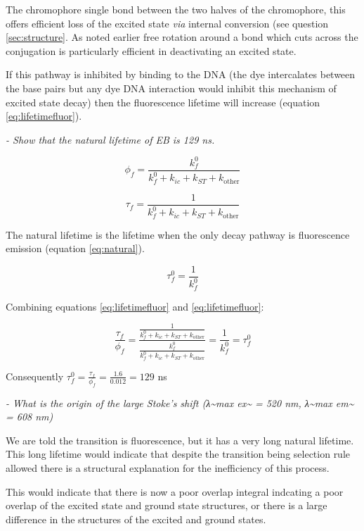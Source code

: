 \documentclass[
]{book}
\begin{document}
The chromophore single bond between the two halves of the chromophore, this offers efficient loss of the excited state \emph{via} internal conversion (see question \ref{sec:structure}. As noted earlier free rotation around a bond which cuts across the conjugation is particularly efficient in deactivating an excited state.

If this pathway is inhibited by binding to the DNA (the dye intercalates between the base pairs but any dye DNA interaction would inhibit this mechanism of excited state decay) then the fluorescence lifetime will increase (equation \eqref{eq:lifetimefluor}).

\emph{- Show that the natural lifetime of EB is 129 ns.}

\begin{equation*}
\phi_f = \frac{k_f^0}{k_f^0+k_{ic}+ k_{ST}+k_{\textrm{other}}}
\end{equation*}

\begin{equation*}
\tau_f = \frac{1}{k_f^0+k_{ic}+ k_{ST}+k_{\textrm{other}}}
\end{equation*}

The natural lifetime is the lifetime when the only decay pathway is fluorescence emission (equation \eqref{eq:natural}).

\begin{equation*}
\tau_f^0 = \frac{1}{k_f^0}
\end{equation*}

Combining equations \eqref{eq:lifetimefluor} and \eqref{eq:lifetimefluor}:

\begin{equation*}
\frac{\tau_f}{\phi_f}=\frac{\frac{1}{k_f^0+k_{ic}+ k_{ST}+k_{\textrm{other}}}}{\frac{k_f^0}{k_f^0+k_{ic}+ k_{ST}+k_{\textrm{other}}}}=\frac{1}{k_f^0}=\tau_f^0
\end{equation*}

Consequently \(\tau_f^0 = \frac{\tau_f}{\phi_f}=\frac{1.6}{0.012}= 129\) ns

\emph{- What is the origin of the large Stoke's shift (λ\textasciitilde max ex\textasciitilde{} = 520 nm, λ\textasciitilde max em\textasciitilde{} = 608 nm)}

We are told the transition is fluorescence, but it has a very long natural lifetime. This long lifetime would indicate that despite the transition being selection rule allowed there is a structural explanation for the inefficiency of this process.

This would indicate that there is now a poor overlap integral indcating a poor overlap of the excited state and ground state structures, or there is a large difference in the structures of the excited and ground states.
\end{document}
